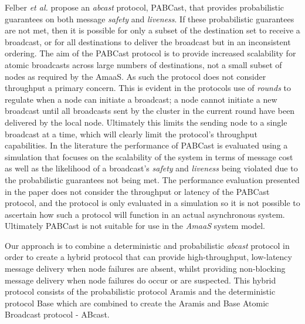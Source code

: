     Felber \emph{et al.} \citep{Felber01probabilisticatomic} propose an \emph{abcast} protocol, \textsf{PABCast}, that provides probabilistic guarantees on both message \emph{safety} and \emph{liveness}.  If these probabilistic guarantees are not met, then it is possible for only a subset of the destination set to receive a broadcast, or for all destinations to deliver the broadcast but in an inconsistent ordering.  The aim of the  \textsf{PABCast} protocol is to provide increased scalability for atomic broadcasts across large numbers of destinations, not a small subset of nodes as required by the \textsf{AmaaS}.  As such the protocol does not consider throughput a primary concern.  This is evident in the protocols use of \emph{rounds} to regulate when a node can initiate a broadcast; a node cannot initiate a new broadcast until all broadcasts sent by the cluster in the current round have been delivered by the local node.  Ultimately this limits the sending node to a single broadcast at a time, which will clearly limit the protocol's throughput capabilities.  In the literature the performance of \textsf{PABCast} is evaluated using a simulation that focuses on the scalability of the system in terms of message cost as well as the likelihood of a broadcast's \emph{safety} and \emph{liveness} being violated due to the probabilistic guarantees not being met. The performance evaluation presented in the paper does not consider the throughput or latency of the \textsf{PABCast} protocol, and the protocol is only evaluated in a simulation so it is not possible to ascertain how such a protocol will function in an actual asynchronous system.  Ultimately \textsf{PABCast} is not suitable for use in the \emph{AmaaS} system model.  
    
    Our approach is to combine a deterministic and probabilistic \emph{abcast} protocol in order to create a hybrid protocol that can provide high-throughput, low-latency message delivery when node failures are absent, whilst providing non-blocking message delivery when node failures do occur or are suspected.  This hybrid protocol consists of the probabilistic protocol \textsf{Aramis} and the deterministic protocol \textsf{Base} which are combined to create the \textsf{Aramis} and \textsf{Base} Atomic Broadcast protocol - \textsf{ABcast}.  
    
